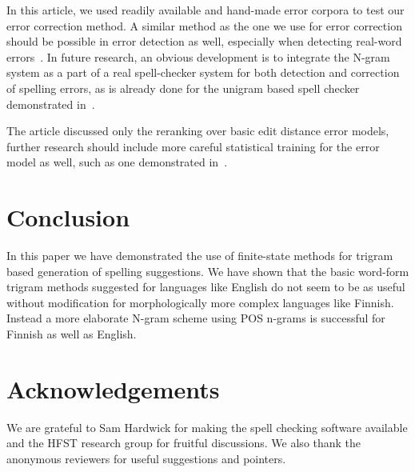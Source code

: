 \documentclass{llncs}
\begin{document}
In this article, we used readily available and hand-made error corpora to test
our error correction method. A similar method as the one we use for error
correction should be possible in error detection as well, especially when
detecting real-word errors~\cite{mays/1991}. In future research, an obvious
development is to integrate the N-gram system as a part of a real spell-checker
system for both detection and correction of spelling errors, as is already done
for the unigram based spell checker demonstrated in~\cite{pirinen/2010/lrec}.

The article discussed only the reranking over basic edit distance error
models, further research should include more careful statistical training for
the error model as well, such as one demonstrated in~\cite{brill/2000}. 

\section{Conclusion}

In this paper we have demonstrated the use of finite-state methods for trigram
based generation of spelling suggestions. We have shown that the basic
word-form trigram methods suggested for languages like English do not seem to
be as useful without modification for morphologically more complex languages
like Finnish.  Instead a more elaborate N-gram scheme using  POS n-grams is
successful for Finnish as well as English.

\section*{Acknowledgements}

We are grateful to Sam Hardwick for making the spell checking software
available and the HFST research group for fruitful discussions. We also thank
the anonymous reviewers for useful suggestions and pointers.



\end{document}
